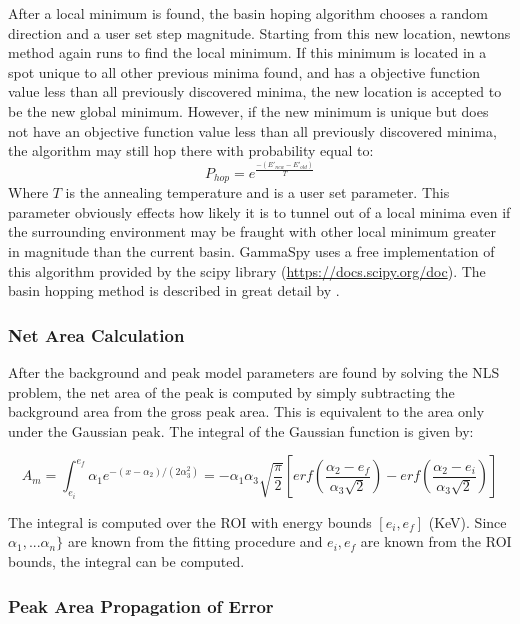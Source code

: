 \documentclass[10pt]{article}
\begin{document}
After a local minimum is found, the basin hoping algorithm chooses a random
direction and a user set step magnitude.  Starting from this new location,
newtons method again runs to find the local minimum.  If this minimum is located in a spot
unique to all other previous minima found, and has a objective function value less than
all previously discovered minima, the new location is accepted to be the new global minimum.
However, if the new minimum is unique but does not have an objective function value
less than all previously discovered minima, the algorithm may still hop there with
probability equal to:
\begin{equation}
    P_{hop} = e^{\frac{-(E'_{new} - E'_{old})}{T}}
\end{equation}
Where $T$ is the annealing temperature and is a user set parameter.  This parameter obviously
effects how likely it is to tunnel out of a local minima even if the surrounding environment may
be fraught with other local minimum greater in magnitude than the current basin.
GammaSpy uses a free implementation of this algorithm provided by the scipy library (\url{https://docs.scipy.org/doc}).
The basin hopping method is described in great detail by \cite{Wales:1997}.

\subsubsection{Net Area Calculation}

After the background and peak model parameters are found by solving the NLS problem,
the net area of the peak is computed by simply subtracting the background area from
the gross peak area.  This is equivalent to the area only under the Gaussian peak.
The integral of the Gaussian function is given by:

\begin{equation}
    A_m = \int_{e_i}^{e_f} \alpha_1 e^{-(x-\alpha_2)/(2\alpha_3^2)}= -\alpha_1 \alpha_3 \sqrt{\frac{\pi}{2}}
    \left[erf\left(\frac{\alpha_2 - e_f}{\alpha_3\sqrt2}\right)  - erf\left(\frac{\alpha_2 - e_i}{\alpha_3\sqrt2}\right)\right]
    \label{model_net_area}
\end{equation}

The integral is computed over the ROI with energy bounds $[e_i, e_f]$ (KeV).  Since
$\alpha_1, ... \alpha_n\}$ are known from the fitting procedure and $e_i, e_f$ are known from the ROI bounds,
the integral can be computed.

\subsubsection{Peak Area Propagation of Error}
\end{document}
